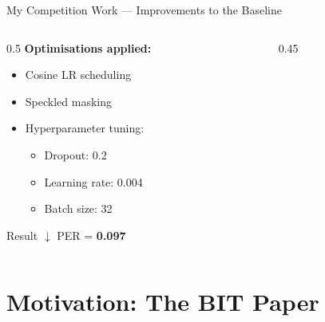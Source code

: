 \documentclass[aspectratio=169]{beamer}
\begin{document}
\begin{frame}{My Competition Work — Improvements to the Baseline}
  \begin{columns}
    \begin{column}{0.5\textwidth}
      \textbf{Optimisations applied:}
      \begin{itemize}
        \item Cosine LR scheduling
        \item Speckled masking
        \item Hyperparameter tuning:
          \begin{itemize}
            \item Dropout: 0.2
            \item Learning rate: 0.004
            \item Batch size: 32
          \end{itemize}
      \end{itemize}
      \vspace{0.5em}
      \begin{block}{Result}
        \centering $\downarrow$ PER = \textbf{0.097}
      \end{block}
    \end{column}
    \begin{column}{0.45\textwidth}
      \begin{center}
      \end{center}
    \end{column}
  \end{columns}
\end{frame}

\section{Motivation: The BIT Paper}
\end{document}

